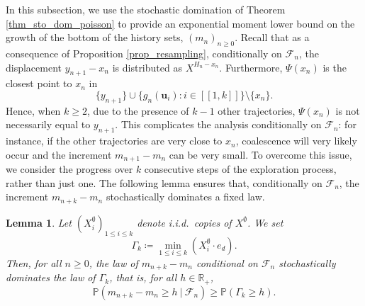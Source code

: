 \documentclass[a4paper, 11pt]{article}
\theoremstyle{plain}
\newtheorem{Lemma}[Theorem]{Lemma}
\theoremstyle{definition}
\newcommand{\R}{\mathbb{R}}
\renewcommand{\P}{\mathbb{P}}
\newcommand{\range}[2]{[\![#1,#2]\!]}
\numberwithin{equation}{section}
\begin{document}
In this subsection, we use the stochastic domination of Theorem \ref{thm_sto_dom_poisson} to provide an exponential moment lower bound on the growth of the bottom of the history sets, $(m_n)_{n\geq0}$. Recall that as a consequence of Proposition \ref{prop_resampling}, conditionally on $\mathcal F_n$, the displacement $y_{n+1}-x_n$ is distributed as $X^{H_n-x_n}$. Furthermore, $\Psi(x_n)$ is the closest point to $x_n$ in
    \[\{y_{n+1}\}\cup\{g_n(\mathbf u_i):i\in\range{1}{k}\}\setminus\{x_n\}.\]
Hence, when $k\geq 2$, due to the presence of $k-1$ other trajectories, $\Psi(x_n)$ is not necessarily equal to $y_{n+1}$. This complicates the analysis conditionally on $\mathcal F_n$: for instance, if the other trajectories are very close to $x_n$, coalescence will very likely occur and the increment $m_{n+1}-m_n$ can be very small. To overcome this issue, we consider the progress over $k$ consecutive steps of the exploration process, rather than just one. The following lemma ensures that, conditionally on $\mathcal F_n$, the increment $m_{n+k}-m_n$ stochastically dominates a fixed law.


\begin{Lemma}
    \label{lemma_progress}
    Let $(X^\emptyset_i)_{1\leq i\leq k}$ denote i.i.d.\ copies of $X^\emptyset$. We set
        \[\Gamma_k\coloneqq\min_{1\leq i\leq k}(X_i^\emptyset\cdot e_d).\]
    Then, for all $n\geq 0$, the law of $m_{n+k}-m_n$ conditional on $\mathcal F_n$ stochastically dominates the law of $\Gamma_k$, that is, for all $h\in\R_+$,
        \[\P\left(m_{n+k}-m_n\geq h~\vert~\mathcal F_n\right)\geq\P(\Gamma_k\geq h).\]
\end{Lemma}
\end{document}
